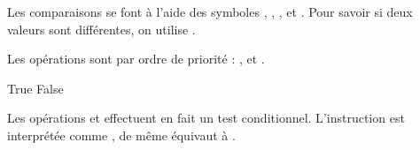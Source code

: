 \documentclass[letterpaper,10pt,english]{sphinxhowto}
\begin{document}
\sphinxAtStartPar
Les comparaisons se font à l’aide des symboles \sphinxcode{\sphinxupquote{<}}, \sphinxcode{\sphinxupquote{<=}}, \sphinxcode{\sphinxupquote{==}}, \sphinxcode{\sphinxupquote{>}} et \sphinxcode{\sphinxupquote{>=}}. Pour savoir si deux valeurs sont différentes, on utilise \sphinxcode{\sphinxupquote{!=}}.

\sphinxAtStartPar
Les opérations sont par ordre de priorité : ,  et .

\begin{sphinxVerbatim}[commandchars=\\\{\}]
    
    
\end{sphinxVerbatim}

\begin{sphinxVerbatim}[commandchars=\\\{\}]
True
False
\end{sphinxVerbatim}

\sphinxAtStartPar
Les opérations  et  effectuent en fait un test conditionnel. L’instruction  est interprétée comme , de même  équivaut à .

\begin{sphinxVerbatim}[commandchars=\\\{\}]
   

  

 
     
        
   
    
\end{sphinxVerbatim}
\end{document}
